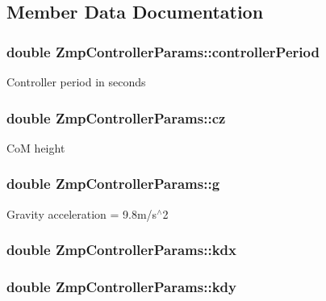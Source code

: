 \subsection{\-Member \-Data \-Documentation}
\hypertarget{structZmpControllerParams_a495732ae992cece73c131d04f9ab0cb2}{
\subsubsection[{controller\-Period}]{\setlength{\rightskip}{0pt plus 5cm}double {\bf \-Zmp\-Controller\-Params\-::controller\-Period}}}\label{structZmpControllerParams_a495732ae992cece73c131d04f9ab0cb2}
\-Controller period in seconds \hypertarget{structZmpControllerParams_ad9ebbe3027001ce1600a8ac556061f7e}{
\subsubsection[{cz}]{\setlength{\rightskip}{0pt plus 5cm}double {\bf \-Zmp\-Controller\-Params\-::cz}}}\label{structZmpControllerParams_ad9ebbe3027001ce1600a8ac556061f7e}
\-Co\-M height \hypertarget{structZmpControllerParams_a66ef6924d304ac0376ee64c2aa8234f9}{
\subsubsection[{g}]{\setlength{\rightskip}{0pt plus 5cm}double {\bf \-Zmp\-Controller\-Params\-::g}}}\label{structZmpControllerParams_a66ef6924d304ac0376ee64c2aa8234f9}
\-Gravity acceleration = 9.\-8m/s$^\wedge$2 \hypertarget{structZmpControllerParams_a423b5aa189459a96c2a271a656ccef48}{
\subsubsection[{kdx}]{\setlength{\rightskip}{0pt plus 5cm}double {\bf \-Zmp\-Controller\-Params\-::kdx}}}\label{structZmpControllerParams_a423b5aa189459a96c2a271a656ccef48}
\hypertarget{structZmpControllerParams_ab27d119cdbcb1ce102e7bd0c95e8d78c}{
\subsubsection[{kdy}]{\setlength{\rightskip}{0pt plus 5cm}double {\bf \-Zmp\-Controller\-Params\-::kdy}}}\label{structZmpControllerParams_ab27d119cdbcb1ce102e7bd0c95e8d78c}
